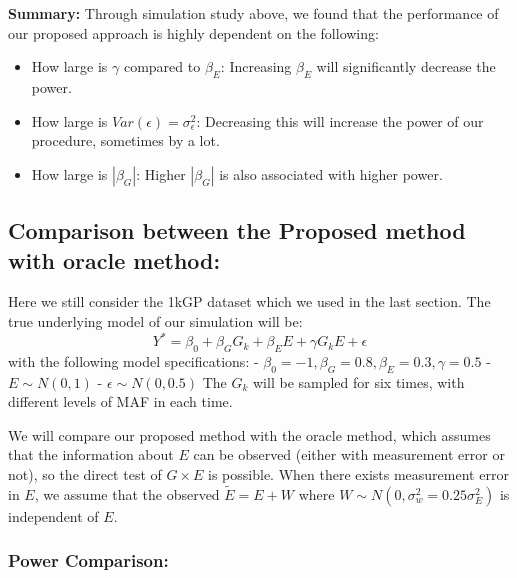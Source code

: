 \documentclass[
]{article}
\providecommand{\tightlist}{%
  \setlength{\itemsep}{0pt}\setlength{\parskip}{0pt}}
\begin{document}
\textbf{Summary:} Through simulation study above, we found that the
performance of our proposed approach is highly dependent on the
following:

\begin{itemize}
\tightlist
\item
  How large is \(\gamma\) compared to \(\beta_E\): Increasing
  \(\beta_E\) will significantly decrease the power.
\item
  How large is \(Var(\epsilon)= \sigma^2_\epsilon\): Decreasing this
  will increase the power of our procedure, sometimes by a lot.
\item
  How large is \(|\beta_G|\): Higher \(|\beta_G|\) is also associated
  with higher power.
\end{itemize}

\clearpage

\hypertarget{comparison-between-the-proposed-method-with-oracle-method}{%
\subsection{Comparison between the Proposed method with oracle
method:}\label{comparison-between-the-proposed-method-with-oracle-method}}

Here we still consider the 1kGP dataset which we used in the last
section. The true underlying model of our simulation will be:
\[Y^* = \beta_0 + \beta_GG_k + \beta_EE+\gamma G_kE + \epsilon\] with
the following model specifications: -
\(\beta_0= -1, \beta_G=0.8, \beta_E= 0.3,\gamma=0.5\) -
\(E \sim N(0,1)\) - \(\epsilon \sim N(0,0.5)\) The \(G_k\) will be
sampled for six times, with different levels of MAF in each time.

We will compare our proposed method with the oracle method, which
assumes that the information about \(E\) can be observed (either with
measurement error or not), so the direct test of \(G\times E\) is
possible. When there exists measurement error in \(E\), we assume that
the observed \(\tilde{E}=E+W\) where
\(W \sim N(0,\sigma_w^2 = 0.25\sigma_E^2)\) is independent of \(E\).

\hypertarget{power-comparison}{%
\subsubsection{Power Comparison:}\label{power-comparison}}
\end{document}
